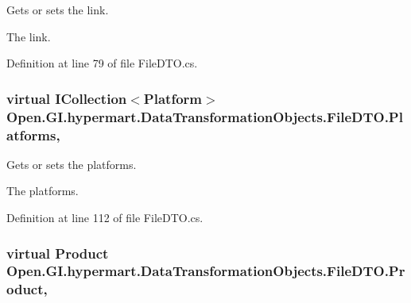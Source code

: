 Gets or sets the link. 

The link. 

Definition at line 79 of file File\+D\+T\+O.\+cs.

\hypertarget{class_open_1_1_g_i_1_1hypermart_1_1_data_transformation_objects_1_1_file_d_t_o_a784824c36cab74d3bc03a8ae55d9a62a}{}
\subsubsection[{Platforms}]{\setlength{\rightskip}{0pt plus 5cm}virtual I\+Collection$<${\bf Platform}$>$ Open.\+G\+I.\+hypermart.\+Data\+Transformation\+Objects.\+File\+D\+T\+O.\+Platforms\hspace{0.3cm}{\ttfamily [get]}, {\ttfamily [set]}}\label{class_open_1_1_g_i_1_1hypermart_1_1_data_transformation_objects_1_1_file_d_t_o_a784824c36cab74d3bc03a8ae55d9a62a}


Gets or sets the platforms. 

The platforms. 

Definition at line 112 of file File\+D\+T\+O.\+cs.

\hypertarget{class_open_1_1_g_i_1_1hypermart_1_1_data_transformation_objects_1_1_file_d_t_o_aa587dd986d4c6d62d8bf5520d3a48e79}{}
\subsubsection[{Product}]{\setlength{\rightskip}{0pt plus 5cm}virtual {\bf Product} Open.\+G\+I.\+hypermart.\+Data\+Transformation\+Objects.\+File\+D\+T\+O.\+Product\hspace{0.3cm}{\ttfamily [get]}, {\ttfamily [set]}}\label{class_open_1_1_g_i_1_1hypermart_1_1_data_transformation_objects_1_1_file_d_t_o_aa587dd986d4c6d62d8bf5520d3a48e79}



